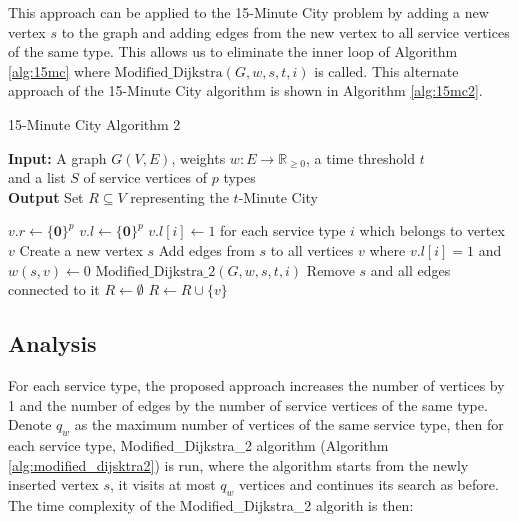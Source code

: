 This approach can be applied to the 15-Minute City problem by adding a new vertex $s$ to the graph and adding edges from the new vertex to all service vertices of the same type. This allows us to eliminate the inner loop of Algorithm \ref{alg:15mc} where $\text{Modified\_Dijkstra}(G, w, s, t, i)$ is called. This alternate approach of the 15-Minute City algorithm is shown in Algorithm \ref{alg:15mc2}.

\begin{algorithm}[H]
    \caption{15-Minute City Algorithm 2} \label{alg:15mc2}
    \textbf{Input:} A graph $G(V,E)$, weights $w:E\rightarrow\mathbb{R}_{\geq 0}$, a time threshold $t$ \\  and a list $S$ of service vertices of $p$ types\\
    \textbf{Output} Set $R\subseteq V$ representing the $t$-Minute City
    \begin{algorithmic}
            \State $v.r \gets \{\mathbf{0}\}^{p}$
            \State $v.l \gets \{\mathbf{0}\}^{p}$
        \EndFor
            \State $v.l[i] \gets 1$ for each service type $i$ which belongs to vertex $v$
        \EndFor
            \State Create a new vertex $s$
            \State Add edges from $s$ to all vertices $v$ where $v.l[i]=1$ and $w(s,v) \gets 0$
            \State $\text{Modified\_Dijkstra\_2}(G,w,s,t,i)$
            \State Remove $s$ and all edges connected to it
        \EndFor
        \State $R\gets\emptyset$
                \State $R \gets R\cup \{v\}$
            \EndIf
        \EndFor
    \end{algorithmic}
\end{algorithm}

\subsection{Analysis}

For each service type, the proposed approach increases the number of vertices by 1 and the number of edges by the number of service vertices of the same type. Denote $q_w$ as the maximum number of vertices of the same service type, then for each service type, Modified\_Dijkstra\_2 algorithm (Algorithm \ref{alg:modified_dijsktra2}) is run, where the algorithm starts from the newly inserted vertex $s$, it visits at most $q_w$ vertices and continues its search as before. The time complexity of the Modified\_Dijkstra\_2 algorith is then:

